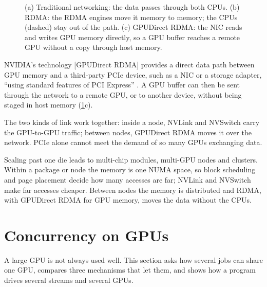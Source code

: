 \documentclass[../main.tex]{subfiles}
\begin{document}
\begin{figure}[tb]
  \centering
  
  \caption{(a) Traditional networking: the data passes through both CPUs.
    (b) RDMA: the RDMA engines move it memory to memory; the CPUs
    (dashed) stay out of the path.  (c) GPUDirect RDMA: the NIC reads and
    writes GPU memory directly, so a GPU buffer reaches a remote GPU
    without a copy through host memory.}
  \label{fig:l09-rdma}
\end{figure}

\begin{definition}
  NVIDIA's technology
  [GPUDirect RDMA] provides a direct data path
  between GPU memory and a third-party PCIe device, such as a NIC or a
  storage adapter, \enquote{using standard features of PCI Express}
  \cite{nvidia2026gpudirectrdma}.  A GPU buffer can then
  be sent through the network to a remote GPU, or to another device,
  without being staged in host memory (\cref{fig:l09-rdma}c).
\end{definition}

%
The two kinds of link work together: inside a node, NVLink and NVSwitch
carry the GPU-to-GPU traffic; between nodes, GPUDirect RDMA moves it
over the network.  PCIe alone cannot meet the demand of so many GPUs
exchanging data.

\begin{keypoint}
  Scaling past one die leads to multi-chip modules, multi-GPU nodes and
  clusters.  Within a package or node the memory is one NUMA space, so
  block scheduling and page placement decide how many accesses are far;
  NVLink and NVSwitch make far accesses cheaper.  Between nodes the
  memory is distributed and RDMA, with GPUDirect RDMA for GPU memory,
  moves the data without the CPUs.
\end{keypoint}

\section{Concurrency on GPUs}
\label{sec:l09-concurrency}

A large GPU is not always used well.  This section
asks how several jobs can share one GPU, compares three mechanisms that
let them, and shows how a program drives several streams and several
GPUs.
\end{document}
